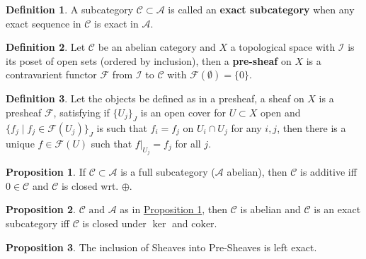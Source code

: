 \documentclass[11pt]{article}
\theoremstyle{definition}
\newtheorem{defn}{Definition}
\newtheorem{prop}{Proposition}
\newcommand{\set}[1]{\{#1\}}
\newcommand{\tand}{\text{ and }}
\newcommand{\coker}{\text{coker}}
\begin{document}
    \begin{defn}
        A subcategory \(\mathcal{C} \subset \mathcal{A}\) is called an \textbf{exact subcategory} when any exact sequence in \(\mathcal{C}\) is exact in \(\mathcal{A}\).
    \end{defn}
    \begin{defn}
        Let \(\mathcal{C}\) be an abelian category and \(X\) a topological space with \(\mathcal{I}\) is its poset of open sets (ordered by inclusion), then a \textbf{pre-sheaf} on \(X\) is a contravarient functor \(\mathcal{F}\) from \(\mathcal{I}\) to \(\mathcal{C}\) with \(\mathcal{F}(\emptyset) = \set{0}\).
    \end{defn}
    \begin{defn}
        Let the objects be defined as in a presheaf, a sheaf on \(X\) is a presheaf \(\mathcal{F}\), satisfying if \(\set{U_j}_J\) is an open cover for \(U \subset X\) open and \(\set{f_j \mid f_j \in \mathcal{F}(U_j)}_J\) is such that \(f_i = f_j\) on \(U_i \cap U_j\) for any \(i,j\), then there is a unique \(f \in \mathcal{F}(U)\) such that \(f\vert_{U_j} = f_j\) for all \(j\).
    \end{defn}
    \begin{prop}\label{prop1.2.1}
    If \(\mathcal{C} \subset \mathcal{A}\) is a full subcategory (\(\mathcal{A}\) abelian), then \(\mathcal{C}\) is additive iff \(0 \in \mathcal{C}\) and \(\mathcal{C}\) is closed wrt. \(\oplus\).
    \end{prop}
    \begin{prop}
        \(\mathcal{C} \tand \mathcal{A}\) as in \hyperref[prop1.2.1]{Proposition 1}, then \(\mathcal{C}\) is abelian and \(\mathcal{C}\) is an exact subcategory iff \(\mathcal{C}\) is closed under \(\ker\) and \(\coker\).
    \end{prop}
    \begin{prop}
        The inclusion of Sheaves into Pre-Sheaves is left exact.
    \end{prop}
    
\end{document}
